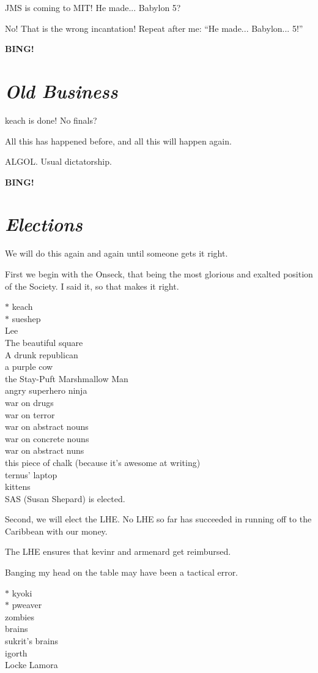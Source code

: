 \documentclass[10pt]{article}
\newcommand{\bing}{{\bf BING!} }
\newcommand{\goto}[1]{\bing \vskip 12pt \section*{{\em{#1}}}}
\begin{document}
JMS is coming to MIT!  He made... Babylon 5?

No!  That is the wrong incantation!  Repeat after me: ``He made... Babylon... 5!'' 

\goto{Old Business}

keach is done!  No finals?

All this has happened before, and all this will happen again.

ALGOL.  Usual dictatorship.

\goto{Elections}

We will do this again and again until someone gets it right.

First we begin with the Onseck, that being the most glorious and
exalted position of the Society.  I said it, so that makes it right.

$*$ keach\\
$*$ sueshep\\
Lee\\
The beautiful square\\
A drunk republican\\
a purple cow\\
the Stay-Puft Marshmallow Man\\
angry superhero ninja\\
war on drugs\\
war on terror\\
war on abstract nouns\\
war on concrete nouns\\
war on abstract nuns\\
this piece of chalk (because it's awesome at writing)\\
ternus' laptop\\
kittens\\

SAS (Susan Shepard) is elected.

Second, we will elect the LHE.  No LHE so far has succeeded in running
off to the Caribbean with our money.

The LHE ensures that kevinr and armenard get reimbursed.

Banging my head on the table may have been a tactical error.

$*$ kyoki\\
$*$ pweaver\\
zombies\\
brains\\
sukrit's brains\\
igorth\\
Locke Lamora\\
\end{document}
